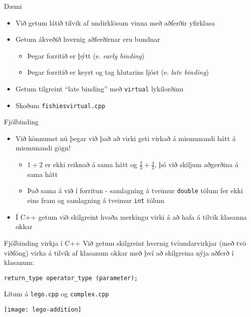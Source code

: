 \documentclass{beamer}
\begin{document}
\begin{frame}{Dæmi}
	\begin{itemize}
		\item Við getum látið tilvik af undirklösum vinna með aðferðir yfirklasa
		\item Getum ákveðið hvernig aðferðirnar eru bundnar
		      \begin{itemize}
			      \item Þegar forritið er þýtt (e. \emph{early binding})
			      \item Þegar forritið er keyrt og tag hlutarins ljóst (e. \emph{late binding})
		      \end{itemize}
		\item Getum tilgreint ``late binding'' með \texttt{virtual} lykilorðinu
		\item Skoðum \texttt{fishiesvirtual.cpp}
	\end{itemize}
\end{frame}

\begin{frame}{Fjölbinding}
	\begin{itemize}
		\item Við könnumst nú þegar við það að virki geti virkað á mismunandi hátt á mismunandi gögn!
		      \begin{itemize}
			      \item $1 + 2$ er ekki reiknað á sama hátt og $\frac{2}{3} + \frac{4}{3}$, þó við skiljum aðgerðina á sama hátt
			      \item Það sama á við í forritun - samlagning á tveimur \texttt{double} tölum fer ekki eins fram og samlagning á tveimur \texttt{int} tölum
		      \end{itemize}
		\item Í C++ getum við skilgreint hvaða merkingu virki á að hafa á tilvik klasanna okkar
	\end{itemize}
\end{frame}

\begin{frame}{Fjölbinding virkja í C++}
	Við getum skilgreint hvernig tvíundarvirkjar (með tvö viðföng) virka á tilvik af klasanum okkar með því að skilgreina nýja aðferð í klasanum:
	\begin{center}
		\texttt{return\_type operator\_type (parameter);}
	\end{center}
	Lítum á \texttt{lego.cpp} og \texttt{complex.cpp}
	\begin{center}
		\texttt{[image: lego-addition]}
	\end{center}
\end{frame}
\end{document}
